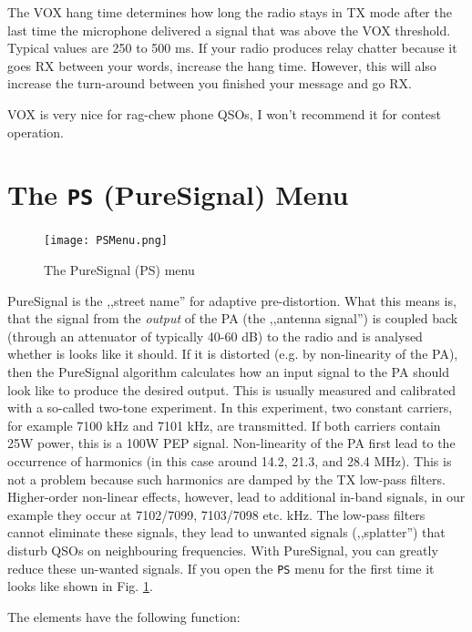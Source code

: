 \documentclass[12pt]{book}
\def\bltt#1{\texttt{\color{blue}#1}}
\begin{document}
The VOX hang time determines how long the radio stays in TX mode after the last time the
microphone delivered a signal that was above the VOX threshold. Typical values are 250 to
500 ms. If your radio produces relay chatter because it goes RX between your words,
increase the hang time. However, this will also increase the turn-around between you finished
your message and go RX.

VOX is very nice for rag-chew phone QSOs, I won't recommend it for contest operation.

\section{The \texttt{PS} (PureSignal) Menu}

\begin{figure}[ht]
\center
\texttt{[image: PSMenu.png]}
\caption{The PureSignal (PS) menu}
\label{fig:PSMenu}
\end{figure}

PureSignal is the ,,street name'' for adaptive pre-distortion. What this means is, that
the signal from the \textit{output} of the PA (the ,,antenna signal'') is coupled
back (through an attenuator of typically 40-60 dB) to the radio and is analysed
whether is looks like it should. If it is distorted (e.g. by non-linearity of the PA),
then the PureSignal algorithm calculates how an input signal to the PA should look like
to produce the desired output. This is usually measured and calibrated with a so-called
two-tone experiment. In this experiment, two constant carriers, for example 7100 kHz
and 7101 kHz, are transmitted. If both carriers contain 25W power, this is
a 100W PEP signal. Non-linearity of the PA first lead to the occurrence of harmonics
(in this case around 14.2, 21.3, and 28.4 MHz). This is not a problem because
such harmonics are  damped by the TX low-pass filters. Higher-order non-linear effects,
however, lead to additional in-band signals, in our example they occur at
7102/7099, 7103/7098 etc. kHz. The low-pass filters cannot eliminate these signals,
they lead to unwanted signals (,,splatter'') that disturb QSOs on neighbouring
frequencies. With PureSignal, you can greatly reduce these un-wanted signals.
If you open the \bltt{PS} menu for the first time it looks like shown in Fig.
\ref{fig:PSMenu}.



The elements have the following function:
\end{document}
